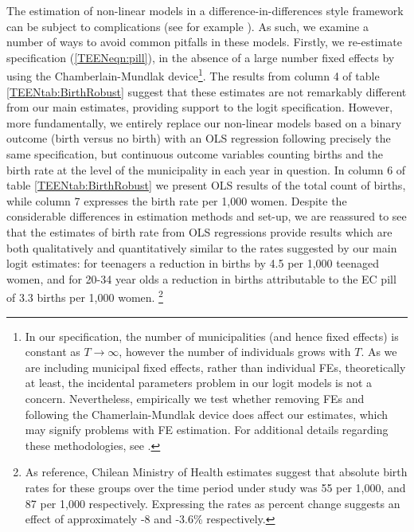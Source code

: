 The estimation of non-linear models in a difference-in-differences style 
framework can be subject to complications (see for example \citet{AiNorton2003}).
As such, we examine a number of ways to avoid common pitfalls in these models.
Firstly, we re-estimate specification (\ref{TEENeqn:pill}), in the absence of
a large number fixed effects by using the Chamberlain-Mundlak device\footnote{%
In our specification, the number of municipalities (and hence fixed effects) is 
constant as $T\rightarrow\infty$, however the number of individuals grows with 
$T$.  As we are including municipal fixed effects, rather than individual FEs, 
theoretically at least, the incidental parameters problem in our logit models is 
not a concern.  Nevertheless, empirically we test whether removing FEs and 
following the Chamerlain-Mundlak device does affect our estimates, which may 
signify problems with FE estimation. For additional details regarding these 
methodologies, see \citet{Chamberlain1980,Wooldridge2005}.}. The results from
column 4 of table \ref{TEENtab:BirthRobust} suggest that these estimates are not
remarkably different from our main estimates, providing support to the logit 
specification.  However, more fundamentally, we entirely replace our non-linear
models based on a binary outcome (birth versus no birth) with an OLS regression
following precisely the same specification, but continuous outcome variables
counting births and the birth rate at the level of the municipality in each year
in question. In column 6 of table \ref{TEENtab:BirthRobust} we present OLS 
results of the total count of births, while column 7 expresses the birth rate 
per 1,000 women. Despite the considerable differences in estimation methods and 
set-up, we are reassured to see that the estimates of birth rate from OLS 
regressions provide results which are both qualitatively and quantitatively 
similar to the rates suggested by our main logit estimates: for teenagers a 
reduction in births by 4.5 per 1,000 teenaged women, and for 20-34 year olds a 
reduction in births attributable to the EC pill of 3.3 births per 1,000 women.%
\footnote{As reference, Chilean Ministry of Health estimates suggest that 
absolute birth rates for these groups over the time period under study was 55 per 
1,000, and 87 per 1,000 respectively.  Expressing the rates as percent change 
suggests an effect of approximately -8 and -3.6\% respectively.}

